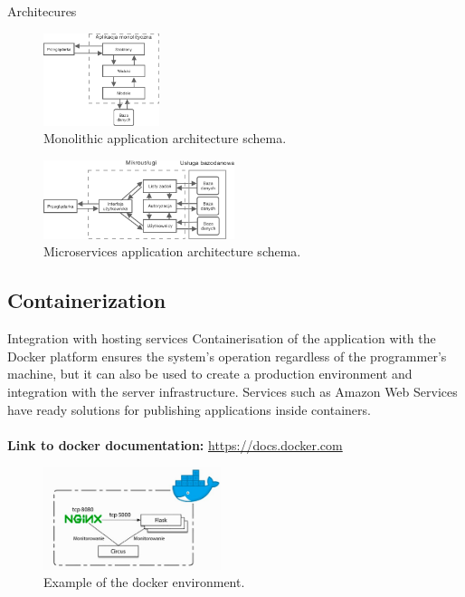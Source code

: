 \documentclass{beamer}
\begin{document}
	
	\begin{frame}{Architecures}
			\begin{figure}[h!]
			\centering
			\includegraphics[height=2.7cm]{Pictures/architekturaMono}
			\caption{Monolithic application architecture schema.}	
			\label{fig:architekturaTroj}
		\end{figure}
		\begin{figure}[h!]
			\centering
			\includegraphics[height=2.3cm]{Pictures/architekturaMirko.png}
			\caption{Microservices application architecture schema.}	
			\label{fig:architekturaTroj}
		\end{figure}
	\end{frame}
	
	\subsection{Containerization}
	\begin{frame}{Integration with hosting services}
	Containerisation of the application with the Docker platform ensures the system's operation regardless of the programmer's machine, but it can also be used to create a production environment and integration with the server infrastructure. Services such as Amazon Web Services have ready solutions for publishing applications inside containers. \\
	~\\
	\textbf{Link to docker documentation:} \url{https://docs.docker.com}
	
	\begin{figure}[h!]
			\centering
			\includegraphics[height=3cm]{Pictures/docker}
			\caption{Example of the docker environment.}	
			\label{fig:architekturaTroj}
		\end{figure}
	\end{frame}
	
\end{document}
